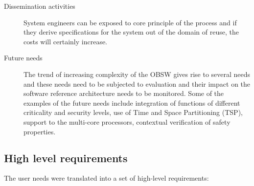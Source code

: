 \begin{description}
\item [Dissemination activities] System engineers can be exposed to core principle of the process and if they derive specifications for the system out of the domain of reuse, the costs will certainly increase.

\item [Future needs] The trend of increasing complexity of the OBSW gives rise to several needs and these needs need to be subjected to evaluation and their impact on the software reference architecture needs to be monitored. Some of the examples of the future needs include integration of functions of different criticality and security levels, use of Time and Space Partitioning (TSP), support to the multi-core processors, contextual verification of safety properties.     
\end{description} 

\subsection{High level requirements}
\label{subsection: High level requirements}
The user needs were translated into a set of high-level requirements:

